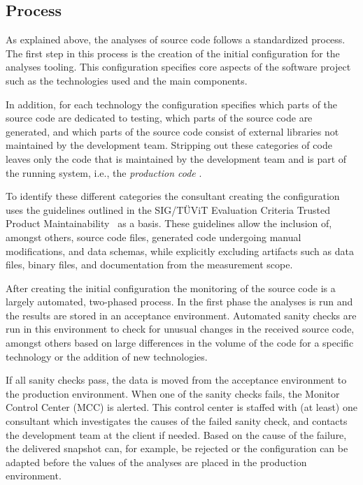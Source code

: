 \subsection{Process}

As explained above, the analyses of source code follows a standardized process.
The first step in this process is the creation of the initial configuration for the analyses tooling.
This configuration specifies core aspects of the software project such as the technologies used and the main components. 

In addition, for each technology the configuration specifies which parts of the source code are dedicated to testing, which parts of the source code are generated, and which parts of the source code consist of external libraries not maintained by the development team.
Stripping out these categories of code leaves only the code that is maintained by the development team and is part of the running system, i.e., the \emph{production code} \cite{alves2011categories}. 

To identify these different categories the consultant creating the configuration uses the guidelines outlined in the SIG/T\"UViT Evaluation Criteria Trusted Product Maintainability~\cite{sig-maintainability-model} as a basis.
These guidelines allow the inclusion of, amongst others, source code files, generated code undergoing manual modifications, and data schemas, while explicitly excluding artifacts such as data files, binary
files, and documentation from the measurement scope. 

After creating the initial configuration the monitoring of the source code is a largely automated, two-phased process.
In the first phase the analyses is run and the results are stored in an acceptance environment.
Automated sanity checks are run in this environment to check for unusual changes in the received source code, amongst others based on large differences in the volume of the code for a specific technology or the addition of new technologies. 

If all sanity checks pass, the data is moved from the acceptance environment to the production environment.
When one of the sanity checks fails, the Monitor Control Center (MCC) is alerted.
This control center is staffed with (at least) one consultant which investigates the causes of the failed sanity check, and contacts the development team at the client if needed.
Based on the cause of the failure, the delivered snapshot can, for example, be rejected or the configuration can be adapted before the values of the analyses are placed in the production environment. 


